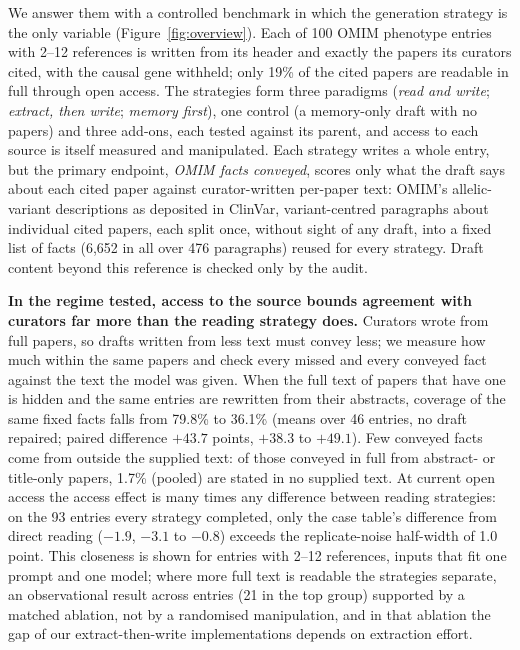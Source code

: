 \documentclass{article} %
\begin{document}
We answer them with a controlled benchmark in which the generation strategy is the only variable (Figure~\ref{fig:overview}). Each of 100 OMIM phenotype entries with 2--12 references is written from its header and exactly the papers its curators cited, with the causal gene withheld; only 19\% of the cited papers are readable in full through open access. The strategies form three paradigms (\emph{read and write}; \emph{extract, then write}; \emph{memory first}), one control (a memory-only draft with no papers) and three add-ons, each tested against its parent, and access to each source is itself measured and manipulated. Each strategy writes a whole entry, but the primary endpoint, \emph{OMIM facts conveyed}, scores only what the draft says about each cited paper against curator-written per-paper text: OMIM's allelic-variant descriptions as deposited in ClinVar, variant-centred paragraphs about individual cited papers, each split once, without sight of any draft, into a fixed list of facts (6,652 in all over 476 paragraphs) reused for every strategy. Draft content beyond this reference is checked only by the audit.

\textbf{In the regime tested, access to the source bounds agreement with curators far more than the reading strategy does.} Curators wrote from full papers, so drafts written from less text must convey less; we measure how much within the same papers and check every missed and every conveyed fact against the text the model was given. When the full text of papers that have one is hidden and the same entries are rewritten from their abstracts, coverage of the same fixed facts falls from 79.8\% to 36.1\% (means over 46 entries, no draft repaired; paired difference $+43.7$ points, $+38.3$ to $+49.1$). Few conveyed facts come from outside the supplied text: of those conveyed in full from abstract- or title-only papers, 1.7\% (pooled) are stated in no supplied text. At current open access the access effect is many times any difference between reading strategies: on the 93 entries every strategy completed, only the case table's difference from direct reading ($-1.9$, $-3.1$ to $-0.8$) exceeds the replicate-noise half-width of 1.0 point. This closeness is shown for entries with 2--12 references, inputs that fit one prompt and one model; where more full text is readable the strategies separate, an observational result across entries (21 in the top group) supported by a matched ablation, not by a randomised manipulation, and in that ablation the gap of our extract-then-write implementations depends on extraction effort.
\end{document}
